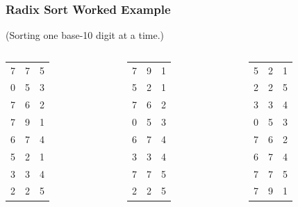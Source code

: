 \documentclass{beamer}
\begin{document}
\begin{frame} \frametitle{Radix Sort Worked Example}
\begin{center}
(Sorting one base-10 digit at a time.)
\begin{columns}
\begin{column}{0.25\textwidth}
  \begin{center}
    \begin{tabular}{ccg}
      7&7&5 \\
      0&5&3 \\
      7&6&2 \\
      7&9&1 \\
      6&7&4 \\
      5&2&1 \\
      3&3&4 \\
      2&2&5 \\
    \end{tabular}
  \end{center}
\end{column}
\begin{column}{0.25\textwidth}
  \begin{center}
    \begin{tabular}{cgc}
      7&9&1 \\
      5&2&1 \\
      7&6&2 \\
      0&5&3 \\
      6&7&4 \\
      3&3&4 \\
      7&7&5 \\
      2&2&5 \\
    \end{tabular}
  \end{center}
\end{column}
\begin{column}{0.25\textwidth}
  \begin{center}
    \begin{tabular}{gcc}
      5&2&1 \\
      2&2&5 \\
      3&3&4 \\
      0&5&3 \\
      7&6&2 \\
      6&7&4 \\
      7&7&5 \\
      7&9&1 \\
    \end{tabular}
  \end{center}
\end{column}

\end{columns}
\end{center}
\end{frame}
\end{document}
